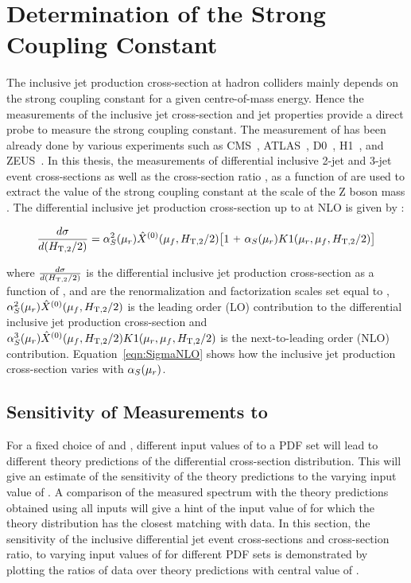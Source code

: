 \chapter{Determination of the Strong Coupling Constant}
\label{chap:Alphas}
The inclusive jet production cross-section at hadron colliders mainly depends on the strong coupling constant \alps for a given centre-of-mass energy. Hence the measurements of the inclusive jet cross-section and jet properties provide a direct probe to measure the strong coupling constant. The measurement of \alps has been already done by various experiments such as CMS~\cite{Chatrchyan:2013txa, Chatrchyan:2013haa, Khachatryan:2014waa, CMS:2014mna, Khachatryan:2016mlc}, ATLAS~\cite{ATLAS:2015yaa}, D0~\cite{Abazov:2009nc, Abazov:2012lua}, H1~\cite{Andreev:2014wwa, Andreev:2016tgi}, and ZEUS~\cite{Abramowicz:2012jz}. In this thesis, the measurements of differential inclusive 2-jet and 3-jet event cross-sections as well as the cross-section ratio \ratio, as a function of \httwo are used to extract the value of the strong coupling constant at  the  scale  of  the  Z boson mass \alpsmz. The differential inclusive jet production cross-section up to at NLO is given by \cite{Affolder:2001hn} :

 \begin{equation}
 \frac{d\sigma}{d(\httwo)} = \alpha_S^2(\mur)\hat{X}^{(0)}(\muf,\httwo)\big[1~\plus \alpha_S(\mur)K1(\mur, \muf,\httwo)\big]
 \label{eqn:SigmaNLO}
 \end{equation}

 where $\frac{d\sigma}{d(\httwo)}$ is the differential inclusive jet production cross-section as a function of \httwo, \mur and \muf are the renormalization and factorization scales set equal to \httwo, $\alpha_S^2(\mu_r)\hat{X}^{(0)}(\mu_f,H_{\mathrm{T,2}}/2)$ is the leading order (LO) contribution to the differential inclusive jet production cross-section and $\alpha_S^3(\mu_r)\hat{X}^{(0)}(\mu_f,H_{\mathrm{T,2}}/2)K1(\mu_r, \mu_f,H_{\mathrm{T,2}}/2)$ is the next-to-leading order (NLO) contribution. Equation~\ref{eqn:SigmaNLO} shows how the inclusive jet production cross-section varies with $\alpha_S(\mu_r)$. 
 
\section{Sensitivity of Measurements to \texorpdfstring{\alpsmz}{alpha-S(M(Z))}}
\label{sec:sensitivity}
 
For a fixed choice of \mur and \muf, different input values of \alpsmz to a PDF set will lead to different theory predictions of the differential cross-section distribution. This will give an estimate of the sensitivity of the theory predictions to the varying input value of \alpsmz. A comparison of the measured spectrum with the theory predictions obtained using all \alpsmz inputs will give a hint of the input value of \alpsmz for which the theory distribution has the closest matching with data. In this section, the sensitivity of the inclusive differential jet event cross-sections and cross-section ratio, \ratio to varying input values of \alpsmz for different PDF sets is demonstrated by plotting the ratios of data over theory predictions with central value of \alpsmz.

